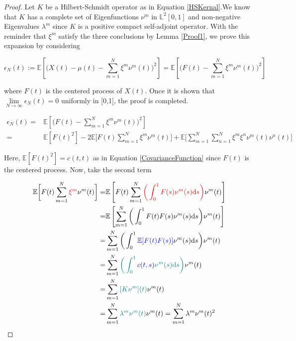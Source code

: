 \documentclass[11pt,twoside,a4paper]{article}
\begin{document}
	\begin{proof}
		
		Let $K$ be a Hilbert-Schmidt operator as in Equation \ref{HSKernal}.We know that $K$ has a complete set of Eigenfunctions ${\nu^m}$ in $\mathbb{L}^{2}[0,1]$  and non-negative Eigenvalues $\lambda^m$ since $K$ is a positive compact self-adjoint operator. With the reminder that $\xi^m$ satisfy the three conclusions by Lemma \ref{Proof1}, we prove this expansion by considering
		
		\begin{equation}
			\epsilon_{N}(t) := \mathbb{E} \left[\bigg( X(t) -\mu(t)- \sum_{m=1}^{N} \xi^m \nu^m(t)\bigg)^2 \right]
			= \mathbb{E} \left[\bigg( F(t) - \sum_{m=1}^{N} \xi^m \nu^m(t)\bigg)^2 \right]
		\end{equation}
	
		where $F(t)$ is the centered process of $X(t)$.
		Once it is shown that $\lim\limits_{N \rightarrow \infty} \epsilon_{N}(t) = 0$ uniformly in [0,1], the proof is completed.
		
		\begin{equation}\label{Thr1}
			\begin{split}
				\epsilon_{N}(t) = &\mathbb{E} \left[\bigg( F(t) - \sum_{m=1}^{N} \xi^m 	\nu^m(t)\bigg)^2 \right]\\
				= & \mathbb{E}[F(t)^{2}] - 2\mathbb{E}\bigg[F(t)\sum_{m=1}^{N}\xi^m\nu^m(t)\bigg] + \mathbb{E}\bigg[\sum_{m=1}^{N}\sum_{n=1}^{N}\xi^m\xi^n\nu^m(t)\nu^n(t)\bigg]
			\end{split}
		\end{equation}
		
		Here, $\mathbb{E}[F(t)^{2}] = c(t,t)$ as in Equation \ref{CovarianceFunction} since $F(t)$ is the centered process. Now, take the second term
		
		\begin{equation}\label{Thr2}
			\begin{split}
				\mathbb{E} \bigg[ F(t) \sum_{m=1}^{N} {\color{red}\xi^m}\nu^m(t) \bigg] = & \mathbb{E} \left[ F(t) \sum_{m=1}^{N} {\color{red}\bigg(\int_{0}^{1} F(s)\nu^m(s)\mathrm{d}s\bigg)} \nu^m(t) \right]\\
				= & \mathbb{E} \left[ \sum_{m=1}^{N} \bigg(\int_{0}^{1} F(t)F(s)\nu^m(s)\mathrm{d}s\bigg) \nu^m(t) \right]\\
				= & \sum_{m=1}^{N} \bigg(\int_{0}^{1} {\color{blue}\mathbb{E}[F(t)F(s)]}\nu^m(s)\mathrm{d}s\bigg)\nu^m(t)\\
				= & \sum_{m=1}^{N} {\color{teal}\bigg(\int_{0}^{1} {\color{blue}c(t,s)} \nu^m(s)\mathrm{d}s\bigg)}\nu^m(t)\\
				= & \sum_{m=1}^{N}{\color{teal}[K\nu^m](t)}\nu^m(t) \\
				= &\sum_{m=1}^{N}{\color{teal}\lambda^m\nu^m(t)}\nu^m(t) = \sum_{m=1}^{N}\lambda^m\nu^m(t)^{2}
			\end{split}
		\end{equation} 
		

\end{proof}
\end{document}
